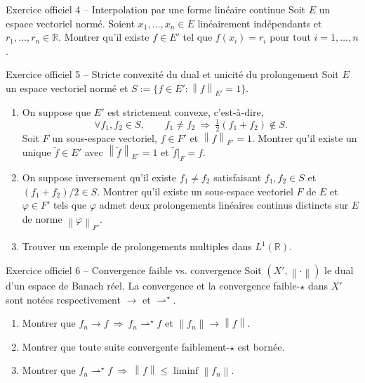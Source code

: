 \documentclass[11pt,a4paper]{article}
\newcommand{\R}{\mathbb{R}}
\newcommand{\norm}[1]{\left\|#1\right\|}
\newcommand{\wks}{\rightharpoonup^{\!\star}}
\theoremstyle{definition}
\begin{document}
\begin{exo}{Exercice officiel 4 -- Interpolation par une forme linéaire continue}
Soit $E$ un espace vectoriel normé. Soient $x_1,\dots,x_n\in E$ linéairement indépendants et $r_1,\dots,r_n\in\R$. Montrer qu'il existe $f\in E'$ tel que $f(x_i)=r_i$ pour tout $i=1,\dots,n$.
\end{exo}

\begin{exo}{Exercice officiel 5 -- Stricte convexité du dual et unicité du prolongement}
Soit $E$ un espace vectoriel normé et $S:=\{f\in E':\norm f_{E'}=1\}$.
\begin{enumerate}[label=(\alph*)]
  \item On suppose que $E'$ est strictement convexe, c'est-à-dire,
  \[
  \forall f_1,f_2\in S,\qquad f_1\ne f_2\ \Rightarrow\ \tfrac12(f_1+f_2)\notin S .
  \]
  Soit $F$ un sous-espace vectoriel, $f\in F'$ et $\norm f_{F'}=1$. Montrer qu'il existe un unique $\tilde f\in E'$ avec $\norm{\tilde f}_{E'}=1$ et $\tilde f|_F=f$.
  \item On suppose inversement qu'il existe $f_1\ne f_2$ satisfaisant $f_1,f_2\in S$ et $(f_1+f_2)/2\in S$. Montrer qu'il existe un sous-espace vectoriel $F$ de $E$ et $\varphi\in F'$ tels que $\varphi$ admet deux prolongements linéaires continus distincts sur $E$ de norme $\norm\varphi_{F'}$.
  \item Trouver un exemple de prolongements multiples dans $L^1(\R)$.
\end{enumerate}
\end{exo}

\begin{exo}{Exercice officiel 6 -- Convergence faible vs. convergence}
Soit $(X',\norm\cdot)$ le dual d'un espace de Banach réel. La convergence et la convergence faible-$\star$ dans $X'$ sont notées respectivement $\to$ et $\wks$.
\begin{enumerate}[label=(\alph*)]
  \item Montrer que $f_n\to f\ \Rightarrow\ f_n\wks f$ et $\norm{f_n}\to\norm f$.
  \item Montrer que toute suite convergente faiblement-$\star$ est bornée.
  \item Montrer que $f_n\wks f\ \Rightarrow\ \norm f\le\liminf\norm{f_n}$.
\end{enumerate}
\end{exo}
\end{document}
